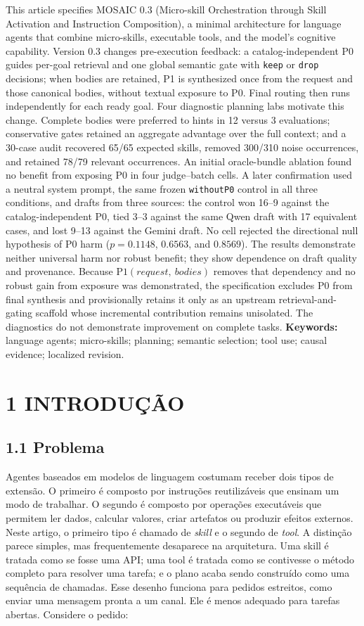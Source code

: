 \documentclass[12pt,a4paper]{article}
\begin{document}
This article specifies MOSAIC 0.3 (Micro-skill Orchestration through Skill Activation and Instruction Composition), a minimal architecture for language agents that combine micro-skills, executable tools, and the model's cognitive capability. Version 0.3 changes pre-execution feedback: a catalog-independent P0 guides per-goal retrieval and one global semantic gate with \texttt{keep} or \texttt{drop} decisions; when bodies are retained, P1 is synthesized once from the request and those canonical bodies, without textual exposure to P0. Final routing then runs independently for each ready goal. Four diagnostic planning labs motivate this change. Complete bodies were preferred to hints in 12 versus 3 evaluations; conservative gates retained an aggregate advantage over the full context; and a 30-case audit recovered 65/65 expected skills, removed 300/310 noise occurrences, and retained 78/79 relevant occurrences. An initial oracle-bundle ablation found no benefit from exposing P0 in four judge--batch cells. A later confirmation used a neutral system prompt, the same frozen \texttt{withoutP0} control in all three conditions, and drafts from three sources: the control won 16--9 against the catalog-independent P0, tied 3--3 against the same Qwen draft with 17 equivalent cases, and lost 9--13 against the Gemini draft. No cell rejected the directional null hypothesis of P0 harm (\(p=0.1148\), \(0.6563\), and \(0.8569\)). The results demonstrate neither universal harm nor robust benefit; they show dependence on draft quality and provenance. Because \(\mathrm{P1}(request,\ bodies)\) removes that dependency and no robust gain from exposure was demonstrated, the specification excludes P0 from final synthesis and provisionally retains it only as an upstream retrieval-and-gating scaffold whose incremental contribution remains unisolated. The diagnostics do not demonstrate improvement on complete tasks. \textbf{Keywords:} language agents; micro-skills; planning; semantic selection; tool use; causal evidence; localized revision.


\section*{1 INTRODUÇÃO}

\subsection*{1.1 Problema}

Agentes baseados em modelos de linguagem costumam receber dois tipos de extensão. O primeiro é composto por instruções reutilizáveis que ensinam um modo de trabalhar. O segundo é composto por operações executáveis que permitem ler dados, calcular valores, criar artefatos ou produzir efeitos externos. Neste artigo, o primeiro tipo é chamado de\textit{ skill} e o segundo de\textit{ tool}. A distinção parece simples, mas frequentemente desaparece na arquitetura. Uma skill é tratada como se fosse uma API; uma tool é tratada como se contivesse o método completo para resolver uma tarefa; e o plano acaba sendo construído como uma sequência de chamadas. Esse desenho funciona para pedidos estreitos, como enviar uma mensagem pronta a um canal. Ele é menos adequado para tarefas abertas. Considere o pedido:
\end{document}
